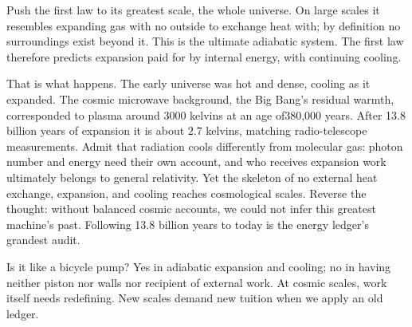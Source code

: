
\begin{thought}
Push the first law to its greatest scale, the whole universe. On large scales it resembles expanding gas with no outside to exchange heat with; by definition no surroundings exist beyond it. This is the ultimate adiabatic system. The first law therefore predicts expansion paid for by internal energy, with continuing cooling.

That is what happens. The early universe was hot and dense, cooling as it expanded. The cosmic microwave background, the Big Bang's residual warmth, corresponded to plasma around 3000 kelvins at an age of380,000 years. After 13.8 billion years of expansion it is about \(2.7\) kelvins, matching radio-telescope measurements. Admit that radiation cools differently from molecular gas: photon number and energy need their own account, and who receives expansion work ultimately belongs to general relativity. Yet the skeleton of no external heat exchange, expansion, and cooling reaches cosmological scales. Reverse the thought: without balanced cosmic accounts, we could not infer this greatest machine's past. Following 13.8 billion years to today is the energy ledger's grandest audit.

Is it like a bicycle pump? Yes in adiabatic expansion and cooling; no in having neither piston nor walls nor recipient of external work. At cosmic scales, work itself needs redefining. New scales demand new tuition when we apply an old ledger.
\end{thought}

